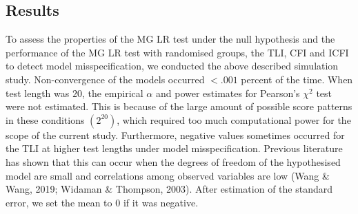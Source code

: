 \documentclass[Royal,sageapa,times,doublespace]{sagej}
\begin{document}
\subsection{Results}
To assess the properties of the MG LR test under the null hypothesis and the performance of the MG LR test with randomised groups, the TLI, CFI and ICFI to detect model misspecification, we conducted the above described simulation study. Non-convergence of the models occurred $<.001$ percent of the time. When test length was $20$, the empirical $\alpha$ and power estimates for Pearson's $\chi^2$ test were not estimated. This is because of the large amount of possible score patterns in these conditions $(2^{20})$, which required too much computational power for the scope of the current study. Furthermore, negative values sometimes occurred for the TLI at higher test lengths under model misspecification. Previous literature has shown that this can occur when the degrees of freedom of the hypothesised model are small and correlations among observed variables are low (Wang \& Wang, 2019; Widaman \& Thompson, 2003). After estimation of the standard error, we set the mean to $0$ if it was negative.\\
\end{document}
